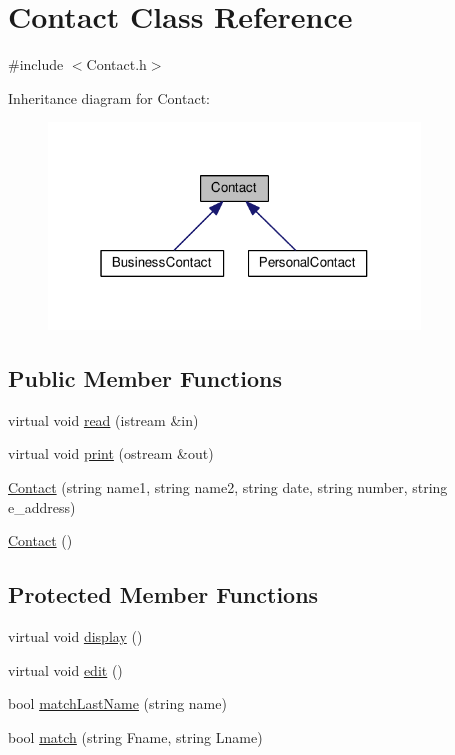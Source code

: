 \hypertarget{classContact}{}\section{Contact Class Reference}
\label{classContact}


{\ttfamily \#include $<$Contact.\+h$>$}



Inheritance diagram for Contact\+:
\nopagebreak
\begin{figure}[H]
\begin{center}
\leavevmode
\includegraphics[width=280pt]{classContact__inherit__graph}
\end{center}
\end{figure}
\subsection*{Public Member Functions}
\begin{DoxyCompactItemize}
\item 
virtual void \hyperlink{classContact_a129d7132ff55adf52737ca7e364d6420}{read} (istream \&in)
\item 
virtual void \hyperlink{classContact_a0167449fa2e8039fbc8fff705329c6d1}{print} (ostream \&out)
\item 
\hyperlink{classContact_ac0c3c018b56acb9a064f017a00a3a0c1}{Contact} (string name1, string name2, string date, string number, string e\+\_\+address)
\item 
\hyperlink{classContact_ae39444f378e6de7fd6c3e60981949af5}{Contact} ()
\end{DoxyCompactItemize}
\subsection*{Protected Member Functions}
\begin{DoxyCompactItemize}
\item 
virtual void \hyperlink{classContact_a1a7b491fba3111a679bfae344d75d19d}{display} ()
\item 
virtual void \hyperlink{classContact_a1e8e2536913df381990b8ed35d562dd6}{edit} ()
\item 
bool \hyperlink{classContact_aeff0842a6152f13203db721cd7c479fd}{match\+Last\+Name} (string name)
\item 
bool \hyperlink{classContact_a7d5d537bfe7be46e04b99c433fa00d01}{match} (string Fname, string Lname)
\end{DoxyCompactItemize}
